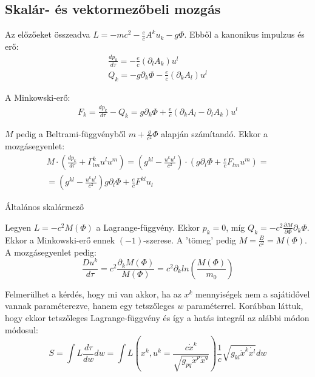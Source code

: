 \documentclass[a4paper,12pt]{article}
\begin{document}
\subsection{ Skalár- és vektormezőbeli mozgás}
\par Az előzőeket összeadva $L = -mc^{2} - \frac{e}{c}A^{k}u_{k} - g\Phi$. Ebből a kanonikus impulzus és erő:
\begin{gather*}
    \frac{dp_{k}}{d\tau} = -\frac{e}{c}(\partial_{l}A_{k})u^{l} \\
    Q_{k} = -g\partial_{k}\Phi - \frac{e}{c}(\partial_{k}A_{l})u^{l}
\end{gather*}
\par A Minkowski-erő:
\begin{gather*}
    F_{k} = \frac{dp_{k}}{d\tau} - Q_{k} = g\partial_{k}\Phi + \frac{e}{c}(\partial_{k}A_{l} - \partial_{l}A_{k})u^{l}
\end{gather*}
\par $M$ pedig a Beltrami-függvényből $m + \frac{g}{c^{2}}\Phi$ alapján számítandó. Ekkor a mozgásegyenlet:
\begin{align*}
    M\cdot(\frac{dp_{k}}{d\tau} + \Gamma_{lm}^{k}u^{l}u^{m}) = (g^{kl} - \frac{u^{k}u^{l}}{c^{2}})\cdot(g\partial_{l}\Phi + \frac{e}{c}F_{lm}u^{m}) = \\
    = (g^{kl} - \frac{u^{k}u^{l}}{c^{2}})g\partial_{l}\Phi + \frac{e}{c}F^{kl}u_{l}
\end{align*}
\begin{subsection}{ Általános skalármező}
\par Legyen $L = -c^{2}M(\Phi)$ a Lagrange-függvény. Ekkor $p_{k} = 0$, míg $Q_{k} = -c^{2}\frac{\partial M}{\partial \Phi}\partial_{k}\Phi$. Ekkor a Minkowski-erő ennek $(-1)$-szerese. A 'tömeg' pedig $M = \frac{B}{c^{2}} = M(\Phi)$. A mozgásegyenlet pedig:
\begin{equation*}
    \frac{Du^{k}}{d\tau} = c^{2}\frac{\partial_{k}M(\Phi)}{M(\Phi)} = c^{2}\partial_{k}ln(\frac{M(\Phi)}{m_{0}})
\end{equation*}
\end{subsection}
\par Felmerülhet a kérdés, hogy mi van akkor, ha az $x^{k}$ mennyiségek nem a sajátidővel vannak paraméterezve, hanem egy tetszőleges $w$ paraméterrel. Korábban láttuk, hogy ekkor tetszőleges Lagrange-függvény és így a hatás integrál az alábbi módon módosul:
\begin{equation*}
    S = \int L \frac{d\tau}{dw}dw = \int L(x^{k}, u^{k} = \frac{c\dot{x}^{k}}{\sqrt{g_{pq}\dot{x}^{p}\dot{x}^{q}}})\frac{1}{c}\sqrt{g_{kl}\dot{x}^{k}\dot{x^{l}}}dw
\end{equation*}
\end{document}
